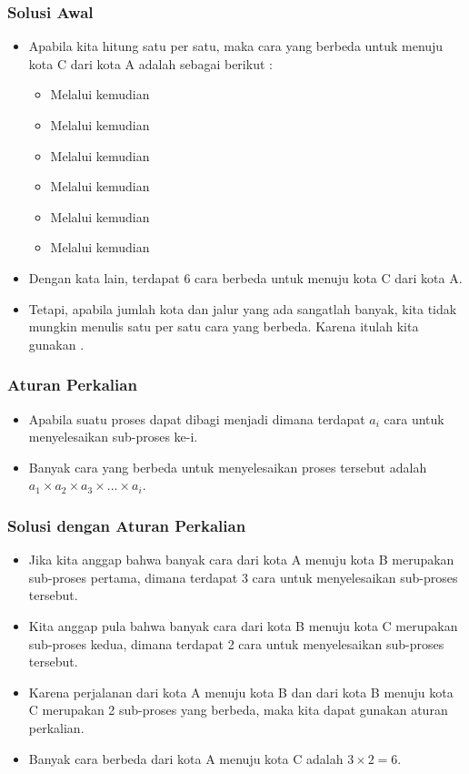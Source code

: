 \begin{frame}
\frametitle{Solusi Awal}
\begin{itemize}
  \item Apabila kita hitung satu per satu, maka cara yang berbeda untuk menuju kota C dari kota A adalah sebagai berikut :
  \begin{itemize}
    \item Melalui  kemudian 
    \item Melalui  kemudian 
    \item Melalui  kemudian 
    \item Melalui  kemudian 
    \item Melalui  kemudian 
    \item Melalui  kemudian 
  \end{itemize}
  \item Dengan kata lain, terdapat 6 cara berbeda untuk menuju kota C dari kota A.
  \item Tetapi, apabila jumlah kota dan jalur yang ada sangatlah banyak, kita tidak mungkin menulis satu per satu cara yang berbeda. Karena itulah kita gunakan .
\end{itemize}
\end{frame} 

\begin{frame}
\frametitle{Aturan Perkalian}
\begin{itemize}
  \item Apabila suatu proses dapat dibagi menjadi  dimana terdapat $a_{i}$ cara untuk menyelesaikan sub-proses ke-i.
  \item Banyak cara yang berbeda untuk menyelesaikan proses tersebut adalah $a_{1} \times a_{2} \times a_{3} \times ... \times a_{i}$.	
\end{itemize}
\end{frame}

\begin{frame}
\frametitle{Solusi dengan Aturan Perkalian}
\begin{itemize}
  \item Jika kita anggap bahwa banyak cara dari kota A menuju kota B merupakan sub-proses pertama, dimana terdapat 3 cara untuk menyelesaikan sub-proses tersebut.
  \item Kita anggap pula bahwa banyak cara dari kota B menuju kota C merupakan sub-proses kedua, dimana terdapat 2 cara untuk menyelesaikan sub-proses tersebut.
  \item Karena perjalanan dari kota A menuju kota B dan dari kota B menuju kota C merupakan 2 sub-proses yang berbeda, maka kita dapat gunakan aturan perkalian.
  \item Banyak cara berbeda dari kota A menuju kota C adalah $3 \times 2 = 6$.
\end{itemize}
\end{frame}

